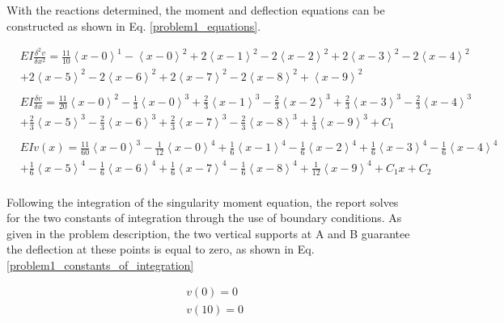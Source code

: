 \documentclass[a4paper]{article}
\begin{document}
With the reactions determined, the moment and deflection equations can be constructed as shown in Eq. \ref{problem1_equations}.

\begin{equation}
    \begin{split}
& EI \frac{\delta^2 v}{\delta x^2} = \frac{11}{10}\left<x-0\right>^1 - \left<x-0\right>^2 +  2\left<x-1\right>^2 - 2\left<x-2\right>^2 +  2\left<x-3\right>^2 - 2\left<x-4\right>^2  \\
& +  2\left<x-5\right>^2 - 2\left<x-6\right>^2  +  2\left<x-7\right>^2 - 2\left<x-8\right>^2 + \left <x-9\right>^2 \\
& \\
& EI \frac{\delta v}{\delta x} =  \frac{11}{20}\left<x-0\right>^2 - \frac{1}{3}\left<x-0\right>^3 +  \frac{2}{3}\left<x-1\right>^3 - \frac{2}{3}\left<x-2\right>^3 +  \frac{2}{3}\left<x-3\right>^3 - \frac{2}{3}\left<x-4\right>^3 \\
&  +  \frac{2}{3}\left<x-5\right>^3 - \frac{2}{3}\left<x-6\right>^3  +  \frac{2}{3}\left<x-7\right>^3 - \frac{2}{3}\left<x-8\right>^3 +  \frac{1}{3}\left<x-9\right>^3 + C_1\\
& \\
& EI v(x) = \frac{11}{60}\left<x-0\right>^3 - \frac{1}{12}\left<x-0\right>^4 +  \frac{1}{6}\left<x-1\right>^4 - \frac{1}{6}\left<x-2\right>^4 + \frac{1}{6}\left<x-3\right>^4 - \frac{1}{6}\left<x-4\right>^4  \\      
& +  \frac{1}{6}\left<x-5\right>^4 - \frac{1}{6}\left<x-6\right>^4  +  \frac{1}{6}\left<x-7\right>^4 - \frac{1}{6}\left<x-8\right>^4 +  \frac{1}{12}\left<x-9\right>^4 + C_1x + C_2 \\
    \end{split}
\label{problem1_equations}
\end{equation}

Following the integration of the singularity moment equation, the report solves for the two constants of integration through the use of boundary conditions. As given in the problem description, the two vertical supports at A and B guarantee the deflection at these points is equal to zero, as shown in Eq. \ref{problem1_constants_of_integration}

\begin{equation}
\begin{split}
	& v(0) = 0 \\
	& v(10) = 0 \\
\end{split}
\label{problem1_constants_of_integration}
\end{equation}
\end{document}
